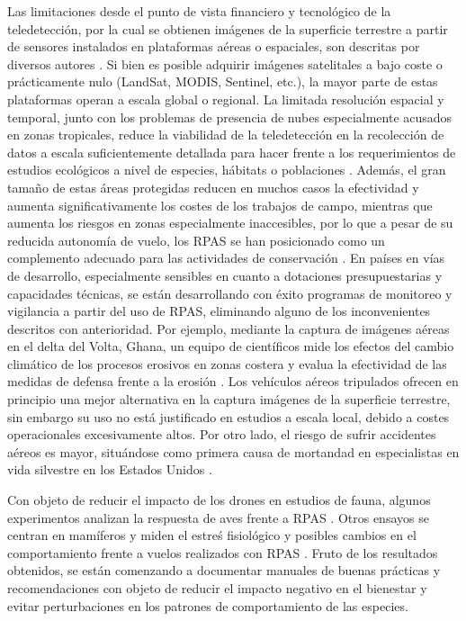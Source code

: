 \documentclass[twocolumn]{extarticle}
\begin{document}
Las limitaciones desde el punto de vista financiero y tecnológico de la
teledetección, por la cual se obtienen imágenes de la superficie
terrestre a partir de sensores instalados en plataformas aéreas o
espaciales, son descritas por diversos autores \citep{Koh2012}. Si bien
es posible adquirir imágenes satelitales a bajo coste o prácticamente
nulo (LandSat, MODIS, Sentinel, etc.), la mayor parte de estas
plataformas operan a escala global o regional. La limitada resolución
espacial y temporal, junto con los problemas de presencia de nubes
especialmente acusados en zonas tropicales, reduce la viabilidad de la
teledetección en la recolección de datos a escala suficientemente
detallada para hacer frente a los requerimientos de estudios ecológicos
a nivel de especies, hábitats o poblaciones \citep{Wulder2004}. Además,
el gran tamaño de estas áreas protegidas reducen en muchos casos la
efectividad y aumenta significativamente los costes de los trabajos de
campo, mientras que aumenta los riesgos en zonas especialmente
inaccesibles, por lo que a pesar de su reducida autonomía de vuelo, los
RPAS se han posicionado como un complemento adecuado para las
actividades de conservación \citep{Zahawi2015}. En países en vías de
desarrollo, especialmente sensibles en cuanto a dotaciones
presupuestarias y capacidades técnicas, se están desarrollando con éxito
programas de monitoreo y vigilancia a partir del uso de RPAS, eliminando
alguno de los inconvenientes descritos con anterioridad. Por ejemplo,
mediante la captura de imágenes aéreas en el delta del Volta, Ghana, un
equipo de científicos mide los efectos del cambio climático de los
procesos erosivos en zonas costera y evalua la efectividad de las
medidas de defensa frente a la erosión \citep{Georg2016}. Los vehículos
aéreos tripulados ofrecen en principio una mejor alternativa en la
captura imágenes de la superficie terrestre, sin embargo su uso no está
justificado en estudios a escala local, debido a costes operacionales
excesivamente altos. Por otro lado, el riesgo de sufrir accidentes
aéreos es mayor, situándose como primera causa de mortandad en
especialistas en vida silvestre en los Estados Unidos \citep{Sasse2003}.

Con objeto de reducir el impacto de los drones en estudios de fauna,
algunos experimentos analizan la respuesta de aves frente a RPAS
\citep{Vas2015}. Otros ensayos se centran en mamíferos y miden el estreś
fisiológico y posibles cambios en el comportamiento frente a vuelos
realizados con RPAS \citep{Ditmer2015}. Fruto de los resultados
obtenidos, se están comenzando a documentar manuales de buenas prácticas
y recomendaciones con objeto de reducir el impacto negativo en el
bienestar y evitar perturbaciones en los patrones de comportamiento de
las especies.
\end{document}
